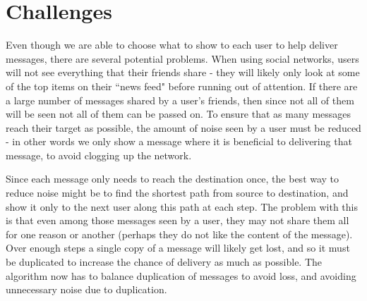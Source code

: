 \documentclass[bsc,frontabs,twoside,singlespacing,parskip,deptreport]{infthesis}     %
\begin{document}
\section{Challenges}
Even though we are able to choose what to show to each user to help deliver messages, there are several potential problems. When using social networks, users will not see everything that their friends share - they will likely only look at some of the top items on their ``news feed" before running out of attention. If there are a large number of messages shared by a user's friends, then since not all of them will be seen not all of them can be passed on. To ensure that as many messages reach their target as possible, the amount of noise seen by a user must be reduced - in other words we only show a message  where it is beneficial to delivering that message, to avoid clogging up the network.

Since each message only needs to reach the destination once, the best way to reduce noise might be to find the shortest path from source to destination, and show it only to the next user along this path at each step. The problem with this is that even among those messages seen by a user, they may not share them all for one reason or another (perhaps they do not like the content of the message). Over enough steps a single copy of a message will likely get lost, and so it must be duplicated to increase the chance of delivery as much as possible. The algorithm now has to balance duplication of messages to avoid loss, and avoiding unnecessary noise due to duplication.
\end{document}
